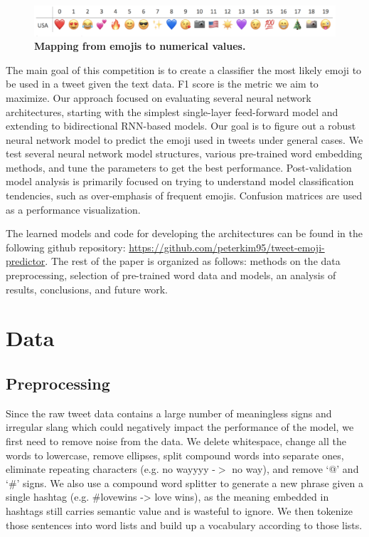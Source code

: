 \documentclass[11pt,a4paper]{article}
\begin{document}
	
	\begin{figure}[H]
		\centering\includegraphics[scale=0.36]{emojis} 
		\caption{\textbf{ Mapping from emojis to numerical values.}}
	\end{figure}
	
	
	The main goal of this competition is to create a classifier the most likely emoji to be used in a tweet given the text data. F1 score is the metric we aim to maximize. Our approach focused on evaluating several neural network architectures, starting with the simplest single-layer feed-forward model and extending to bidirectional RNN-based models. Our goal is to figure out a robust neural network model to predict the emoji used in tweets under general cases. We test several neural network model structures, various pre-trained word embedding methods, and tune the parameters to get the best performance. Post-validation model analysis is primarily focused on trying to understand model classification tendencies, such as over-emphasis of frequent emojis. Confusion matrices are used as a performance visualization. 
	\par
	The learned models and code for developing the architectures can be found in the following github repository: \url{https://github.com/peterkim95/tweet-emoji-predictor}.  The rest of the paper is organized as follows: methods on the data preprocessing, selection of pre-trained word data and models, an analysis of results, conclusions, and future work.
	
	\section{Data}
	\subsection{Preprocessing}
	Since the raw tweet data contains a large number of meaningless signs and irregular slang which could negatively impact the performance of the model, we first need to remove noise from the data. We delete whitespace, change all the words to lowercase, remove ellipses, split compound words into separate ones, eliminate repeating characters (e.g. no wayyyy -$>$ no way), and remove ‘@’ and ‘\#’ signs. We also use a compound word splitter to generate a new phrase given a single hashtag (e.g. \#lovewins -> love wins), as the meaning embedded in hashtags still carries semantic value and is wasteful to ignore. We then tokenize those sentences into word lists and build up a vocabulary according to those lists.
	
\end{document}
